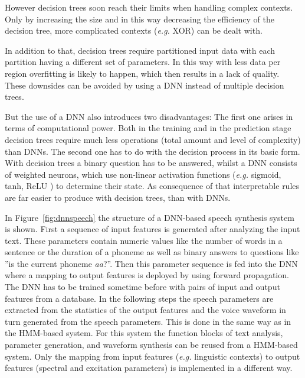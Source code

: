 However decision trees soon reach their limits when handling complex contexts. Only by increasing the size and in this way decreasing the efficiency of the decision tree, more complicated contexts (\textit{e.g.} XOR) can be dealt with. 

In addition to that, decision trees require partitioned input data with each partition having a different set of parameters. In this way with less data per region overfitting
is likely to happen, which then results in a lack of quality. These downsides can be avoided by using a \ac{DNN} instead of multiple decision trees.

But the use of a \ac{DNN} also introduces two disadvantages: The first one arises in terms of computational power. Both in the training and in the prediction stage decision trees require much less operations (total amount and level of complexity) than \acp{DNN}. The second one has to do with the decision process in its basic form. With decision trees a binary question has to be answered, whilst a \ac{DNN} consists of weighted neurons, which use non-linear activation functions (\textit{e.g.} sigmoid, tanh, ReLU \cite{chung:activation}) to determine their state. As consequence of that interpretable rules are far easier to produce with decision trees, than with \acp{DNN}.

In Figure~\ref{fig:dnnspeech} the structure of a \ac{DNN}-based speech synthesis system is shown. First a sequence of input features is generated after analyzing the input text. These parameters contain numeric values like the number of words in a sentence or the duration of a phoneme as well as binary answers to questions like ''is the current phoneme \textit{aa}?''. Then this parameter sequence is fed into the \ac{DNN} where a mapping to output features is deployed by using forward propagation. The \ac{DNN} has to be trained sometime before with pairs of input and output features from a database. In the following steps the speech parameters are extracted from the statistics of the output features and the voice waveform in turn generated from the speech parameters. This is done in the same way as in the \ac{HMM}-based system. For this system the function blocks of text analysis, parameter generation, and waveform synthesis can be reused from a \ac{HMM}-based system. Only the mapping from input features (\textit{e.g.} linguistic contexts) to output features (spectral and excitation parameters) is implemented in a different way.

